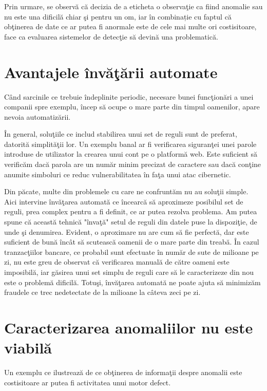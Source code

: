 Prin urmare, se observă că decizia de a eticheta o observaţie ca fiind anomalie 
sau nu este una dificilă chiar şi pentru un om, iar în combinație cu faptul 
că obţinerea de date ce ar putea fi anormale este de cele mai multe ori costisitoare,
face ca evaluarea sistemelor de detecţie să devină una problematică.


\section{Avantajele învăţării automate}

Când sarcinile ce trebuie îndeplinite periodic, necesare bunei funcţionări a unei 
companii spre exemplu, încep să ocupe o mare parte din timpul oamenilor, apare 
nevoia automatizării. 

În general, soluţiile ce includ stabilirea unui set de reguli
sunt de preferat, datorită simplităţii lor. Un exemplu banal ar fi verificarea 
siguranţei unei parole introduse de utilizator la crearea unui cont pe o platformă
web. Este suficient să verificăm dacă parola are un număr minim precizat de caractere 
sau dacă conţine anumite simboluri ce reduc vulnerabilitatea în faţa unui atac cibernetic.

Din păcate, multe din problemele cu care ne confruntăm nu au soluţii simple. 
Aici intervine învăţarea automată ce încearcă să aproximeze posibilul set de reguli, 
prea complex pentru a fi definit, ce ar putea rezolva problema. Am putea spune că 
această tehnică "învaţă" setul de reguli 
din datele puse la dispoziţie, de unde şi denumirea. Evident, o aproximare 
nu are cum să fie perfectă, dar este suficient de bună încât să scutească oamenii de 
o mare parte din treabă. În cazul tranzacţiilor bancare, ce probabil sunt efectuate 
în număr de sute de milioane pe zi, nu este greu de observat că verificarea manuală
de către oameni este imposibilă, iar găsirea unui set simplu de reguli care să 
le caracterizeze din nou este o problemă dificilă. Totuşi, învăţarea automată 
ne poate ajuta să minimizăm fraudele ce trec nedetectate de la milioane la câteva zeci
pe zi.

\section{Caracterizarea anomaliilor nu este viabilă}

Un exemplu ce ilustrează de ce obţinerea de informaţii
despre anomalii este costisitoare ar putea fi activitatea unui
motor defect.

